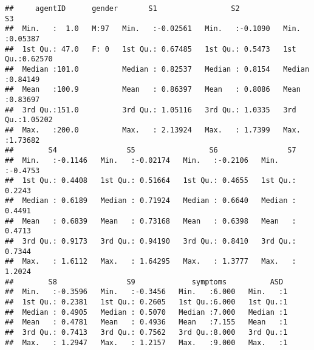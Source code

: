 \documentclass[]{article}
\newenvironment{Shaded}{\begin{snugshade}}{\end{snugshade}}
\newcommand{\KeywordTok}[1]{\textcolor[rgb]{0.13,0.29,0.53}{\textbf{#1}}}
\newcommand{\DecValTok}[1]{\textcolor[rgb]{0.00,0.00,0.81}{#1}}
\newcommand{\StringTok}[1]{\textcolor[rgb]{0.31,0.60,0.02}{#1}}
\newcommand{\CommentTok}[1]{\textcolor[rgb]{0.56,0.35,0.01}{\textit{#1}}}
\newcommand{\OperatorTok}[1]{\textcolor[rgb]{0.81,0.36,0.00}{\textbf{#1}}}
\newcommand{\NormalTok}[1]{#1}
\begin{document}
\begin{Shaded}
\end{Shaded}

\begin{verbatim}
##     agentID      gender       S1                 S2                S3         
##  Min.   :  1.0   M:97   Min.   :-0.02561   Min.   :-0.1090   Min.   :0.05387  
##  1st Qu.: 47.0   F: 0   1st Qu.: 0.67485   1st Qu.: 0.5473   1st Qu.:0.62570  
##  Median :101.0          Median : 0.82537   Median : 0.8154   Median :0.84149  
##  Mean   :100.9          Mean   : 0.86397   Mean   : 0.8086   Mean   :0.83697  
##  3rd Qu.:151.0          3rd Qu.: 1.05116   3rd Qu.: 1.0335   3rd Qu.:1.05202  
##  Max.   :200.0          Max.   : 2.13924   Max.   : 1.7399   Max.   :1.73682  
##        S4                S5                 S6                S7         
##  Min.   :-0.1146   Min.   :-0.02174   Min.   :-0.2106   Min.   :-0.4753  
##  1st Qu.: 0.4408   1st Qu.: 0.51664   1st Qu.: 0.4655   1st Qu.: 0.2243  
##  Median : 0.6189   Median : 0.71924   Median : 0.6640   Median : 0.4491  
##  Mean   : 0.6839   Mean   : 0.73168   Mean   : 0.6398   Mean   : 0.4713  
##  3rd Qu.: 0.9173   3rd Qu.: 0.94190   3rd Qu.: 0.8410   3rd Qu.: 0.7344  
##  Max.   : 1.6112   Max.   : 1.64295   Max.   : 1.3777   Max.   : 1.2024  
##        S8                S9             symptoms          ASD   
##  Min.   :-0.3596   Min.   :-0.3456   Min.   :6.000   Min.   :1  
##  1st Qu.: 0.2381   1st Qu.: 0.2605   1st Qu.:6.000   1st Qu.:1  
##  Median : 0.4905   Median : 0.5070   Median :7.000   Median :1  
##  Mean   : 0.4781   Mean   : 0.4936   Mean   :7.155   Mean   :1  
##  3rd Qu.: 0.7413   3rd Qu.: 0.7562   3rd Qu.:8.000   3rd Qu.:1  
##  Max.   : 1.2947   Max.   : 1.2157   Max.   :9.000   Max.   :1
\end{verbatim}

\begin{Shaded}
\end{Shaded}
\end{document}
